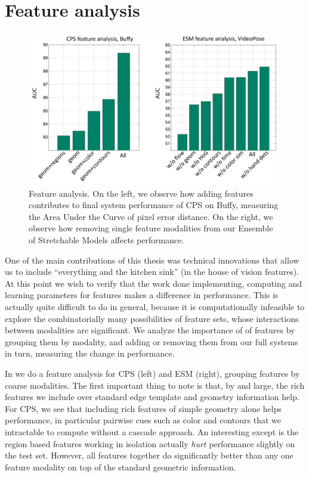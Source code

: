 \section{Feature analysis}
\begin{figure}[tb]
\begin{center}
\includegraphics[width=0.99\textwidth]{figs/ablative-bars}
\caption[Feature analysis.]{Feature analysis.  On the left, we observe how 
adding features contributes to final system performance of CPS on Buffy, 
measuring the Area Under the Curve of pixel error distance.  On the right, we 
observe how removing single feature modalities from our Ensemble of Stretchable 
Models affects performance.}
\label{fig:ablative}
\end{center}
\end{figure}

One of the main contributions of this thesis was technical innovations that 
allow us to include ``everything and the kitchen sink'' (in the house of vision 
features).  At this point we wish to verify that the work done implementing, 
computing and learning parameters for features makes a difference in 
performance.  This is actually quite difficult to do in general, because it is 
computationally infeasible to explore the combinatorially many possibilities of 
feature sets, whose interactions between modalities are significant.  We 
analyze the importance of of features by grouping them by modality, and adding 
or removing them from our full systems in turn, measuring the change in 
performance.

In  we do a feature analysis for CPS (left) and ESM (right), 
grouping features by coarse modalities.  The first important thing to note is 
that, by and large, the rich features we include over standard edge template 
and geometry information help.  For CPS, we see that including rich features of 
simple geometry alone helps performance, in particular pairwise cues such as 
color and contours that we intractable to compute without a cascade approach.  
An interesting except is the region based features working in isolation 
actually {\em hurt} performance slightly on the test set.  However, all 
features together do significantly better than any one feature modality on top 
of the standard geometric information.

